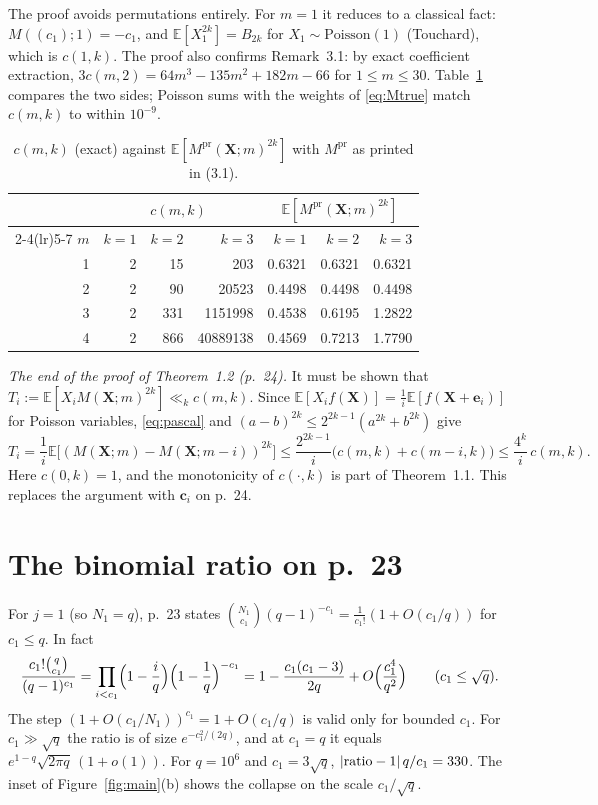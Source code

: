 \documentclass[11pt,a4paper]{amsart}
\theoremstyle{remark}
\newcommand{\bc}{\mathbf c}
\newcommand{\bX}{\mathbf X}
\newcommand{\E}{\mathbb E}
\newcommand{\Mp}{M^{\mathrm{pr}}}
\begin{document}
The proof avoids permutations entirely. For $m=1$ it reduces to a classical fact: $M((c_1);1)=-c_1$,
and $\E[X_1^{2k}]=B_{2k}$ for $X_1\sim\mathrm{Poisson}(1)$ (Touchard), which is $c(1,k)$. The proof also
confirms Remark~3.1: by exact coefficient extraction,
$3c(m,2)=64m^3-135m^2+182m-66$ for $1\le m\le30$. Table~\ref{tab:mom} compares the two sides; Poisson sums with the weights of \eqref{eq:Mtrue}
match $c(m,k)$ to within $10^{-9}$.

\begin{table}[ht]
\centering\small
\caption{$c(m,k)$ (exact) against $\E[\Mp(\bX;m)^{2k}]$ with $\Mp$ as printed in (3.1).}\label{tab:mom}
\begin{tabular}{r rrr rrr}
\toprule
& \multicolumn{3}{c}{$c(m,k)$} & \multicolumn{3}{c}{$\E[\Mp(\bX;m)^{2k}]$}\\
\cmidrule(lr){2-4}\cmidrule(lr){5-7}
$m$ & $k=1$ & $k=2$ & $k=3$ & $k=1$ & $k=2$ & $k=3$\\
\midrule
1 & 2 & 15 & 203 & 0.6321 & 0.6321 & 0.6321\\
2 & 2 & 90 & 20523 & 0.4498 & 0.4498 & 0.4498\\
3 & 2 & 331 & 1151998 & 0.4538 & 0.6195 & 1.2822\\
4 & 2 & 866 & 40889138 & 0.4569 & 0.7213 & 1.7790\\
\bottomrule
\end{tabular}
\end{table}

\emph{The end of the proof of Theorem~1.2 (p.~24).} It must be shown that
$T_i:=\E[X_iM(\bX;m)^{2k}]\ll_kc(m,k)$. Since $\E[X_if(\bX)]=\frac1i\E[f(\bX+\mathbf e_i)]$ for Poisson
variables, \eqref{eq:pascal} and $(a-b)^{2k}\le2^{2k-1}(a^{2k}+b^{2k})$ give
\[
T_i=\frac1i\E\bigl[(M(\bX;m)-M(\bX;m-i))^{2k}\bigr]\le\frac{2^{2k-1}}{i}\bigl(c(m,k)+c(m-i,k)\bigr)\le\frac{4^k}{i}\,c(m,k).
\]
Here $c(0,k)=1$, and the monotonicity of $c(\cdot,k)$ is part of Theorem~1.1. This replaces the argument with
$\bc_i$ on p.~24.

\section{The binomial ratio on p.~23}\label{sec:ratio}

For $j=1$ (so $N_1=q$), p.~23 states
$\binom{N_1}{c_1}(q-1)^{-c_1}=\frac1{c_1!}(1+O(c_1/q))$ for $c_1\le q$. In fact
\[
\frac{c_1!\binom{q}{c_1}}{(q-1)^{c_1}}=\prod_{i<c_1}\Bigl(1-\frac iq\Bigr)\Bigl(1-\frac1q\Bigr)^{-c_1}
=1-\frac{c_1(c_1-3)}{2q}+O\Bigl(\frac{c_1^4}{q^2}\Bigr)\qquad(c_1\le\sqrt q).
\]
The step $(1+O(c_1/N_1))^{c_1}=1+O(c_1/q)$ is valid only for bounded $c_1$. For $c_1\gg\sqrt q$ the ratio is
of size $e^{-c_1^2/(2q)}$, and at $c_1=q$ it equals $e^{1-q}\sqrt{2\pi q}\,(1+o(1))$. For $q=10^6$ and
$c_1=3\sqrt q$, $|{\rm ratio}-1|\,q/c_1=330$. The inset of Figure~\ref{fig:main}(b) shows the collapse
on the scale $c_1/\sqrt q$.
\end{document}
